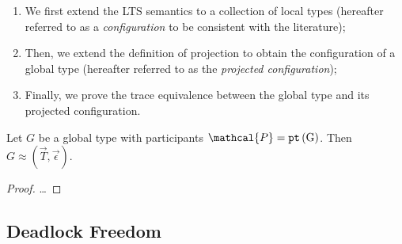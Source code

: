 \begin{enumerate}

\item We first extend the LTS semantics to
a collection of local types (hereafter referred to
as a \textit{configuration} to be consistent with
the literature);

\item Then, we extend the definition of projection to
obtain the configuration of a global type 
(hereafter referred to as the \textit{projected configuration});

\item Finally, we prove the trace equivalence between 
the global type and its projected configuration.

\end{enumerate}

\begin{theorem}
Let $G$ be a global type with participants 
$\mathcal{P} = \mathrm{\pt{G}}$.
Then $G \approx (\vec T, \vec \epsilon)$.
\end{theorem}

\begin{proof}
\dots
\end{proof}

\subsection{Deadlock Freedom}
\label{subsection:newdeadlockfreedom}